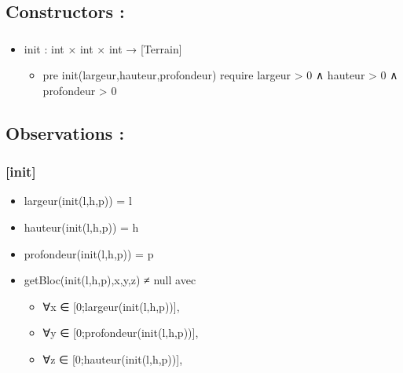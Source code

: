 \documentclass[11pt]{article}
\begin{document}
\subsection{Constructors :}
\label{sec-1.5}

\subsubsection{}

\begin{itemize}

\item init : int × int × int → [Terrain]\\
\label{sec-1.5.1.1}

\begin{itemize}

\item pre init(largeur,hauteur,profondeur) require largeur > 0 ∧ hauteur > 0 ∧ profondeur > 0\\
\label{sec-1.5.1.1.1}


\end{itemize} %
\end{itemize} %
\subsection{Observations :}
\label{sec-1.6}


\subsubsection{[init]}
\label{sec-1.6.1}

\begin{itemize}

\item largeur(init(l,h,p)) = l\\
\label{sec-1.6.1.1}


\item hauteur(init(l,h,p)) = h\\
\label{sec-1.6.1.2}


\item profondeur(init(l,h,p)) = p\\
\label{sec-1.6.1.3}


\item getBloc(init(l,h,p),x,y,z) ≠ null avec\\
\label{sec-1.6.1.4}

\begin{itemize}

\item ∀x ∈ [0;largeur(init(l,h,p))],\\
\label{sec-1.6.1.4.1}


\item ∀y ∈ [0;profondeur(init(l,h,p))],\\
\label{sec-1.6.1.4.2}


\item ∀z ∈ [0;hauteur(init(l,h,p))],\\
\label{sec-1.6.1.4.3}

\end{itemize} %
\end{itemize} %
\end{document}
